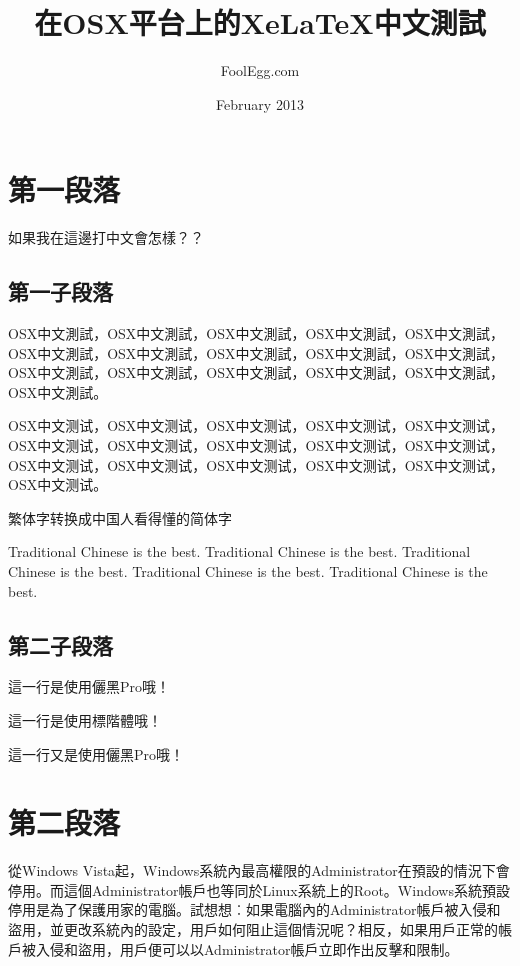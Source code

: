 \documentclass[12pt,a4paper]{article}
\title{\huge 在OSX平台上的XeLaTeX中文測試} %
\author{FoolEgg.com} %
\date{February 2013} %
\newcommand\fontbk{\CJKfamily{biaukai}} %
\begin{document}
\clearpage

\maketitle %

\section{第一段落}
如果我在這邊打中文會怎樣？？

\subsection{第一子段落}

{
\fontsize{14pt}{20pt} %
\selectfont %
OSX中文測試，OSX中文測試，OSX中文測試，OSX中文測試，OSX中文測試，OSX中文測試，OSX中文測試，OSX中文測試，OSX中文測試，OSX中文測試，OSX中文測試，OSX中文測試，OSX中文測試，OSX中文測試，OSX中文測試，OSX中文測試。

OSX中文测试，OSX中文测试，OSX中文测试，OSX中文测试，OSX中文测试，OSX中文测试，OSX中文测试，OSX中文测试，OSX中文测试，OSX中文测试，OSX中文测试，OSX中文测试，OSX中文测试，OSX中文测试，OSX中文测试，OSX中文测试。

繁体字转换成中国人看得懂的简体字

Traditional Chinese is the best. Traditional Chinese is the best. Traditional Chinese is the best. Traditional Chinese is the best. Traditional Chinese is the best.
}

\newpage %

\subsection{第二子段落}

這一行是使用儷黑Pro哦！

{
\fontbk
這一行是使用標階體哦！
}

這一行又是使用儷黑Pro哦！

\section{第二段落}

從Windows Vista起，Windows系統內最高權限的Administrator在預設的情況下會停用。而這個Administrator帳戶也等同於Linux系統上的Root。Windows系統預設停用是為了保護用家的電腦。試想想︰如果電腦內的Administrator帳戶被入侵和盜用，並更改系統內的設定，用戶如何阻止這個情況呢？相反，如果用戶正常的帳戶被入侵和盜用，用戶便可以以Administrator帳戶立即作出反擊和限制。
\end{document}
